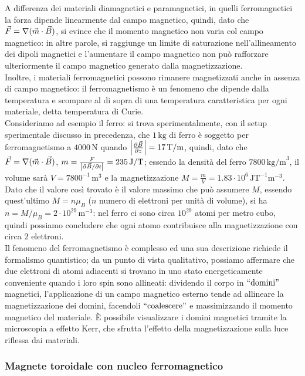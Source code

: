 A differenza dei materiali diamagnetici e paramagnetici, in quelli ferromagnetici la forza dipende linearmente dal campo magnetico, quindi, dato che $ \vec{F} = \nabla(\vec{m}\cdot\vec{B}) $, si evince che il momento magnetico non varia col campo magnetico: in altre parole, si raggiunge un limite di saturazione nell'allineamento dei dipoli magnetici e l'aumentare il campo magnetico non può rafforzare ulteriormente il campo magnetico generato dalla magnetizzazione. \\ 
%
Inoltre, i materiali ferromagnetici possono rimanere magnetizzati anche in assenza di campo magnetico: il ferromagnetismo è un fenomeno che dipende dalla temperatura e scompare al di sopra di una temperatura caratteristica per ogni materiale, detta temperatura di Curie. \\ 
%
Consideriamo ad esempio il ferro: si trova sperimentalmente, con il setup sperimentale discusso in precedenza, che $ 1\,\text{kg} $ di ferro è soggetto per ferromagnetismo a $ 4000\,\text{N} $ quando $ \left\lvert\frac{\partial\vec{B}}{\partial z}\right\rvert = 17\,\text{T/m} $, quindi, dato che $ \vec{F} = \nabla(\vec{m}\cdot\vec{B}) $, $ m = \frac{F}{\left\lvert\partial\vec{B} / \partial t\right\rvert} = 235 \,\text{J/T} $; essendo la densità del ferro $ 7800 \,\text{kg/m}^3 $, il volume sarà $ V = 7800^{-1} \,\text{m}^3 $ e la magnetizzazione $ M = \frac{m}{V} = 1.83 \cdot 10^6 \,\text{JT}^{-1}\text{m}^{-3} $. Dato che il valore così trovato è il valore massimo che può assumere $ M $, essendo quest'ultimo $ M = n\mu_B $ ($ n $ numero di elettroni per unità di volume), si ha $ n = M / \mu_B = 2\cdot 10^{29} \,\text{m}^{-3} $: nel ferro ci sono circa $ 10^{29} $ atomi per metro cubo, quindi possiamo concludere che ogni atomo contribuisce alla magnetizzazione con circa $ 2 $ elettroni. \\ 
%
Il fenomeno del ferromagnetismo è complesso ed una sua descrizione richiede il formalismo quantistico; da un punto di vista qualitativo, possiamo affermare che due elettroni di atomi adiacenti si trovano in uno stato energeticamente conveniente quando i loro spin sono allineati: dividendo il corpo in $ ``\text{domini}" $ magnetici, l'applicazione di un campo magnetico esterno tende ad allineare la magnetizzazione dei domini, facendoli $ ``\text{coalescere}" $ e massimizzando il momento magnetico del materiale. È possibile visualizzare i domini magnetici tramite la microscopia a effetto Kerr, che sfrutta l'effetto della magnetizzazione sulla luce riflessa dai materiali.

\subsubsection{Magnete toroidale con nucleo ferromagnetico}

